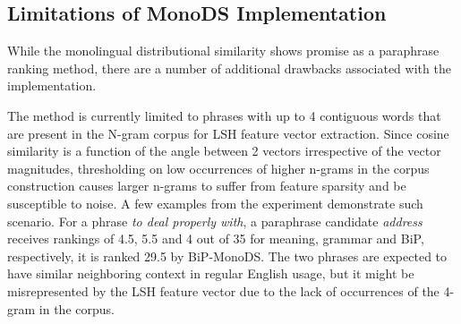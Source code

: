 \documentclass[11pt]{article}
\newcommand{\mnote}[1]{\marginpar{\raggedleft\footnotesize\itshape#1}}
\begin{document}
{{\vspace{-.2cm}
\subsection{Limitations of MonoDS Implementation}%
\vspace{-.1cm}

While the monolingual distributional similarity shows promise as a paraphrase ranking method, there are a number of additional drawbacks associated with the implementation.%

The method is currently limited to phrases with up to 4 contiguous words that are present in the N-gram corpus for LSH feature vector extraction. Since cosine similarity is a function of the angle between 2 vectors irrespective of the vector magnitudes, thresholding on low occurrences of higher n-grams in the corpus construction causes larger n-grams to suffer from feature sparsity and be susceptible to noise. A few examples from the experiment demonstrate such scenario. For a phrase \emph{to deal properly with}, a paraphrase candidate \emph{address} receives rankings of 4.5, 5.5 and 4 out of 35 for meaning, grammar and BiP, respectively, it is ranked 29.5 by BiP-MonoDS. The two phrases are expected to have similar neighboring context in regular English usage, but it might be misrepresented by the LSH feature vector due to the lack of occurrences of the 4-gram in the corpus.

}}
\end{document}

